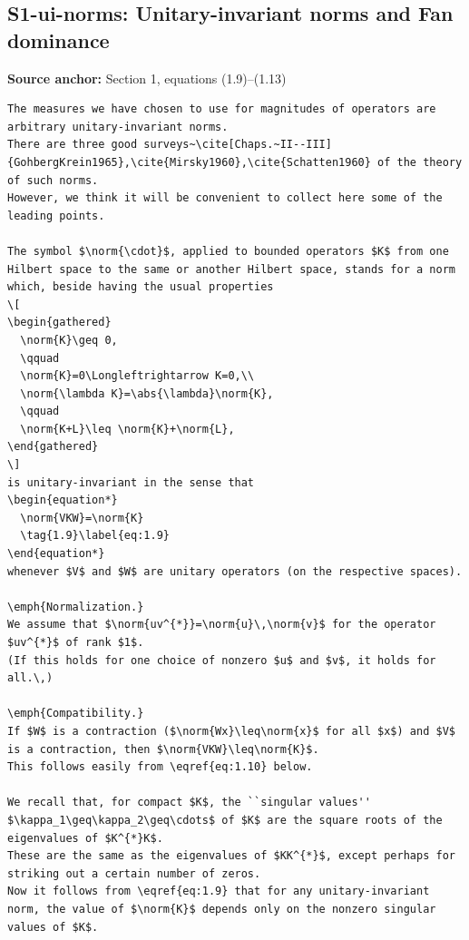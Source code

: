 \subsection*{S1-ui-norms: Unitary-invariant norms and Fan dominance}
\noindent\textbf{Source anchor:} Section 1, equations (1.9)–(1.13)\\
\begin{verbatim}
The measures we have chosen to use for magnitudes of operators are arbitrary unitary-invariant norms.
There are three good surveys~\cite[Chaps.~II--III]{GohbergKrein1965},\cite{Mirsky1960},\cite{Schatten1960} of the theory of such norms.
However, we think it will be convenient to collect here some of the leading points.

The symbol $\norm{\cdot}$, applied to bounded operators $K$ from one Hilbert space to the same or another Hilbert space, stands for a norm which, beside having the usual properties
\[
\begin{gathered}
  \norm{K}\geq 0,
  \qquad
  \norm{K}=0\Longleftrightarrow K=0,\\
  \norm{\lambda K}=\abs{\lambda}\norm{K},
  \qquad
  \norm{K+L}\leq \norm{K}+\norm{L},
\end{gathered}
\]
is unitary-invariant in the sense that
\begin{equation*}
  \norm{VKW}=\norm{K}
  \tag{1.9}\label{eq:1.9}
\end{equation*}
whenever $V$ and $W$ are unitary operators (on the respective spaces).

\emph{Normalization.}
We assume that $\norm{uv^{*}}=\norm{u}\,\norm{v}$ for the operator $uv^{*}$ of rank $1$.
(If this holds for one choice of nonzero $u$ and $v$, it holds for all.\,)

\emph{Compatibility.}
If $W$ is a contraction ($\norm{Wx}\leq\norm{x}$ for all $x$) and $V$ is a contraction, then $\norm{VKW}\leq\norm{K}$.
This follows easily from \eqref{eq:1.10} below.

We recall that, for compact $K$, the ``singular values'' $\kappa_1\geq\kappa_2\geq\cdots$ of $K$ are the square roots of the eigenvalues of $K^{*}K$.
These are the same as the eigenvalues of $KK^{*}$, except perhaps for striking out a certain number of zeros.
Now it follows from \eqref{eq:1.9} that for any unitary-invariant norm, the value of $\norm{K}$ depends only on the nonzero singular values of $K$.


\end{verbatim}
